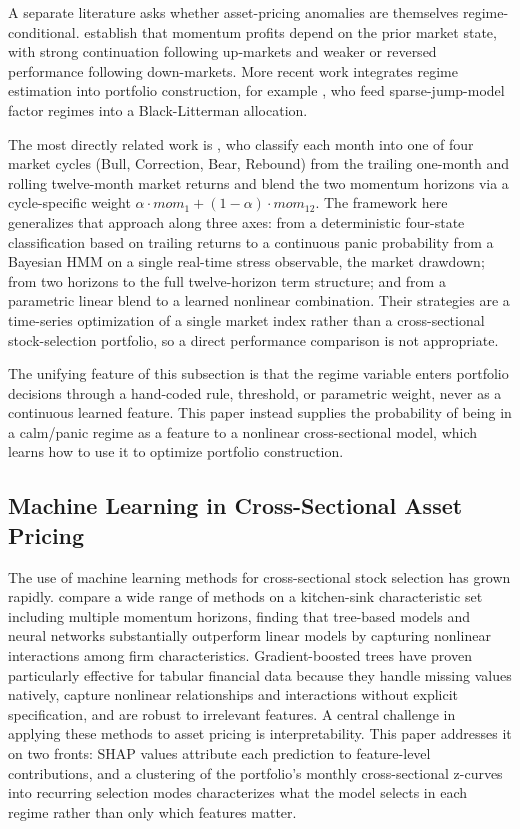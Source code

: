 A separate literature asks whether asset-pricing anomalies are themselves regime-conditional. \citet{Cooper2004} establish that momentum profits depend on the prior market state, with strong continuation following up-markets and weaker or reversed performance following down-markets. More recent work integrates regime estimation into portfolio construction, for example \citet{ShuMulvey2024}, who feed sparse-jump-model factor regimes into a Black-Litterman allocation.

The most directly related work is \citet{GHM2023}, who classify each month into one of four market cycles (Bull, Correction, Bear, Rebound) from the trailing one-month and rolling twelve-month market returns and blend the two momentum horizons via a cycle-specific weight $\alpha \cdot mom_1 + (1-\alpha) \cdot mom_{12}$. The framework here generalizes that approach along three axes: from a deterministic four-state classification based on trailing returns to a continuous panic probability from a Bayesian HMM on a single real-time stress observable, the market drawdown; from two horizons to the full twelve-horizon term structure; and from a parametric linear blend to a learned nonlinear combination. Their strategies are a time-series optimization of a single market index rather than a cross-sectional stock-selection portfolio, so a direct performance comparison is not appropriate.

The unifying feature of this subsection is that the regime variable enters portfolio decisions through a hand-coded rule, threshold, or parametric weight, never as a continuous learned feature. This paper instead supplies the probability of being in a calm/panic regime as a feature to a nonlinear cross-sectional model, which learns how to use it to optimize portfolio construction.

\subsection{Machine Learning in Cross-Sectional Asset Pricing}\label{sec:lit_ml}

The use of machine learning methods for cross-sectional stock selection has grown rapidly. \citet{Gu2020} compare a wide range of methods on a kitchen-sink characteristic set including multiple momentum horizons, finding that tree-based models and neural networks substantially outperform linear models by capturing nonlinear interactions among firm characteristics. Gradient-boosted trees \citep{Chen2016} have proven particularly effective for tabular financial data because they handle missing values natively, capture nonlinear relationships and interactions without explicit specification, and are robust to irrelevant features. A central challenge in applying these methods to asset pricing is interpretability. This paper addresses it on two fronts: SHAP values \citep{Lundberg2017, Lundberg2020} attribute each prediction to feature-level contributions, and a clustering of the portfolio's monthly cross-sectional z-curves into recurring selection modes characterizes what the model selects in each regime rather than only which features matter.


